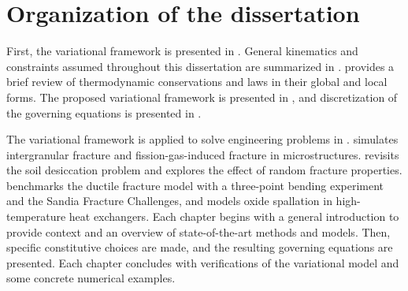 \section{Organization of the dissertation}

First, the variational framework is presented in . General kinematics and constraints assumed throughout this dissertation are summarized in .  provides a brief review of thermodynamic conservations and laws in their global and local forms.
The proposed variational framework is presented in , and discretization of the governing equations is presented in .

The variational framework is applied to solve engineering problems in .  simulates intergranular fracture and fission-gas-induced fracture in microstructures.  revisits the soil desiccation problem and explores the effect of random fracture properties.  benchmarks the ductile fracture model with a three-point bending experiment and the Sandia Fracture Challenges, and models oxide spallation in high-temperature heat exchangers. Each chapter begins with a general introduction to provide context and an overview of state-of-the-art methods and models. Then, specific constitutive choices are made, and the resulting governing equations are presented. Each chapter concludes with verifications of the variational model and some concrete numerical examples.
